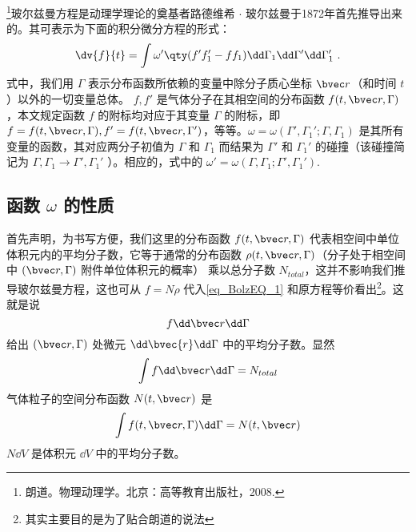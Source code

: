 

\footnote{朗道。物理动理学。北京：高等教育出版社，2008.}玻尔兹曼方程是动理学理论的奠基者路德维希 $\cdot$ 玻尔兹曼于1872年首先推导出来的。其可表示为下面的积分微分方程的形式：
\begin{equation}\label{eq_BolzEQ_1}
\dv{f}{t}=\int\omega'\qty(f'f_1'-ff_1)\dd\Gamma_1\dd\Gamma'\dd\Gamma_1'~.
\end{equation}
式中，我们用 $\Gamma$ 表示分布函数所依赖的变量中除分子质心坐标 $\bvec r$（和时间 $t$ ）以外的一切变量总体。 $f,f'$ 是气体分子在其相空间的分布函数 $f(t,\bvec r,\Gamma)$，本文规定函数 $f$ 的附标均对应于其变量 $\Gamma$ 的附标，即 $f=f(t,\bvec r,\Gamma),f'=f(t,\bvec r,\Gamma')$，等等。$\omega=\omega(\Gamma',\Gamma_1';\Gamma,\Gamma_1)$ 是其所有变量的函数，其对应两分子初值为 $\Gamma$ 和 $\Gamma_1$ 而结果为 $\Gamma'$ 和 $\Gamma_1'$ 的碰撞（该碰撞简记为 $\Gamma,\Gamma_1\rightarrow\Gamma',\Gamma_1'$ ）。相应的，式中的 $\omega'=\omega(\Gamma,\Gamma_1;\Gamma',\Gamma_1')$.

\subsection{函数 $\omega$ 的性质}
首先声明，为书写方便，我们这里的分布函数 $f(t,\bvec r,\Gamma)$ 代表相空间中单位体积元内的平均分子数，它等于通常的分布函数 $\rho(t,\bvec r,\Gamma)$（分子处于相空间中 $(\bvec r,\Gamma)$ 附件单位体积元的概率） 乘以总分子数 $N_{total}$，这并不影响我们推导玻尔兹曼方程，这也可从 $f=N\rho$ 代入\autoref{eq_BolzEQ_1} 和原方程等价看出\footnote{其实主要目的是为了贴合朗道的说法}。这就是说
\begin{equation}
f\dd \bvec r\dd\Gamma
\end{equation}
给出 $(\bvec r,\Gamma)$ 处微元 $\dd\bvec{r}\dd\Gamma$ 中的平均分子数。显然
\begin{equation}
\int f\dd \bvec r\dd\Gamma=N_{total}
\end{equation}
气体粒子的空间分布函数 $N(t,\bvec r)$ 是
\begin{equation}
\int f(t,\bvec r,\Gamma)\dd \Gamma=N(t,\bvec r)
\end{equation}
 $N\dd V$ 是体积元 $\dd V$ 中的平均分子数。

